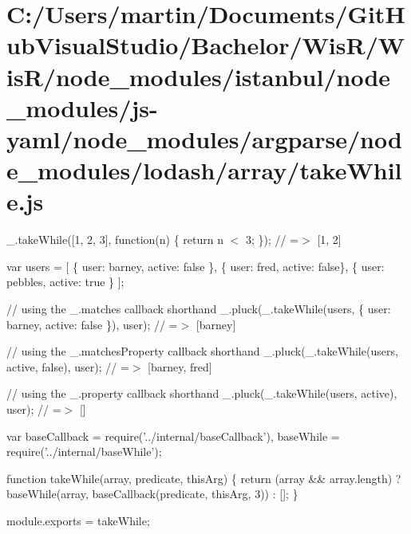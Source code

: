\hypertarget{_c_1_2_users_2martin_2_documents_2_git_hub_visual_studio_2_bachelor_2_wis_r_2_wis_r_2node_modulef5404818e4fc043cb92f8be5b27dab4b}{}\section{C\+:/\+Users/martin/\+Documents/\+Git\+Hub\+Visual\+Studio/\+Bachelor/\+Wis\+R/\+Wis\+R/node\+\_\+modules/istanbul/node\+\_\+modules/js-\/yaml/node\+\_\+modules/argparse/node\+\_\+modules/lodash/array/take\+While.\+js}
\+\_\+.\+take\+While(\mbox{[}1, 2, 3\mbox{]}, function(n) \{ return n $<$ 3; \}); // =$>$ \mbox{[}1, 2\mbox{]}

var users = \mbox{[} \{ \textquotesingle{}user\textquotesingle{}\+: \textquotesingle{}barney\textquotesingle{}, \textquotesingle{}active\textquotesingle{}\+: false \}, \{ \textquotesingle{}user\textquotesingle{}\+: \textquotesingle{}fred\textquotesingle{}, \textquotesingle{}active\textquotesingle{}\+: false\}, \{ \textquotesingle{}user\textquotesingle{}\+: \textquotesingle{}pebbles\textquotesingle{}, \textquotesingle{}active\textquotesingle{}\+: true \} \mbox{]};

// using the {\ttfamily \+\_\+.\+matches} callback shorthand \+\_\+.\+pluck(\+\_\+.\+take\+While(users, \{ \textquotesingle{}user\textquotesingle{}\+: \textquotesingle{}barney\textquotesingle{}, \textquotesingle{}active\textquotesingle{}\+: false \}), \textquotesingle{}user\textquotesingle{}); // =$>$ \mbox{[}\textquotesingle{}barney\textquotesingle{}\mbox{]}

// using the {\ttfamily \+\_\+.\+matches\+Property} callback shorthand \+\_\+.\+pluck(\+\_\+.\+take\+While(users, \textquotesingle{}active\textquotesingle{}, false), \textquotesingle{}user\textquotesingle{}); // =$>$ \mbox{[}\textquotesingle{}barney\textquotesingle{}, \textquotesingle{}fred\textquotesingle{}\mbox{]}

// using the {\ttfamily \+\_\+.\+property} callback shorthand \+\_\+.\+pluck(\+\_\+.\+take\+While(users, \textquotesingle{}active\textquotesingle{}), \textquotesingle{}user\textquotesingle{}); // =$>$ \mbox{[}\mbox{]}


\begin{DoxyCodeInclude}
var baseCallback = require(\textcolor{stringliteral}{'../internal/baseCallback'}),
    baseWhile = require(\textcolor{stringliteral}{'../internal/baseWhile'});

\textcolor{keyword}{function} takeWhile(array, predicate, thisArg) \{
  \textcolor{keywordflow}{return} (array && array.length)
    ? baseWhile(array, baseCallback(predicate, thisArg, 3))
    : [];
\}

module.exports = takeWhile;
\end{DoxyCodeInclude}
 